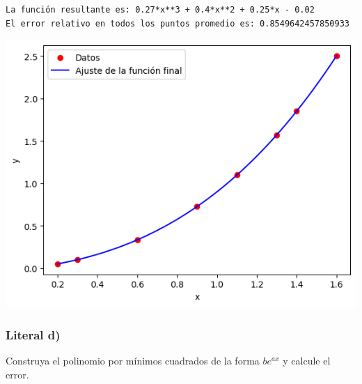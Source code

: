 \documentclass[
  letterpaper,
  DIV=11,
  numbers=noendperiod]{scrartcl}
\begin{document}
\begin{verbatim}
La función resultante es: 0.27*x**3 + 0.4*x**2 + 0.25*x - 0.02
El error relativo en todos los puntos promedio es: 0.8549642457850933
\end{verbatim}

\includegraphics{Tarea8_MN_files/figure-pdf/cell-12-output-2.png}

\subsubsection{Literal d)}\label{literal-d-1}

Construya el polinomio por mínimos cuadrados de la forma \(be^{ax}\) y
calcule el error.
\end{document}
